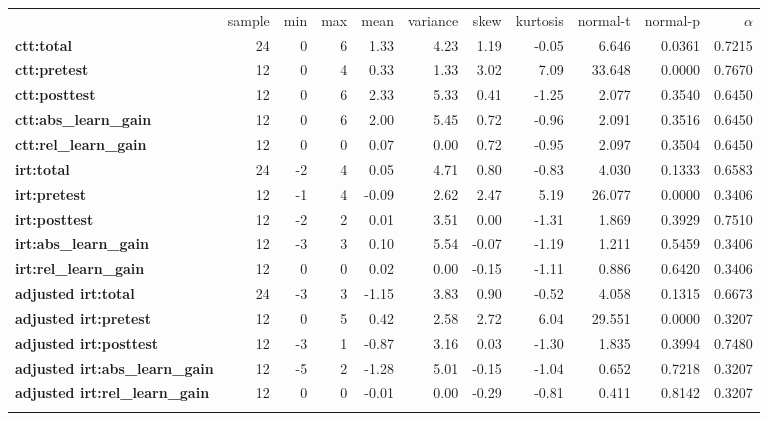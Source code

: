 \documentclass[]{article}
\begin{document}
\begin{longtable}[c]{@{}lrrrrrrrrrr@{}}
\toprule\addlinespace
& sample & min & max & mean & variance & skew & kurtosis & normal-t &
normal-p & $\alpha$
\\\addlinespace
\midrule\endhead
\textbf{ctt:total} & 24 & 0 & 6 & 1.33 & 4.23 & 1.19 & -0.05 & 6.646 &
0.0361 & 0.7215
\\\addlinespace
\textbf{ctt:pretest} & 12 & 0 & 4 & 0.33 & 1.33 & 3.02 & 7.09 & 33.648 &
0.0000 & 0.7670
\\\addlinespace
\textbf{ctt:posttest} & 12 & 0 & 6 & 2.33 & 5.33 & 0.41 & -1.25 & 2.077
& 0.3540 & 0.6450
\\\addlinespace
\textbf{ctt:abs\_learn\_gain} & 12 & 0 & 6 & 2.00 & 5.45 & 0.72 & -0.96
& 2.091 & 0.3516 & 0.6450
\\\addlinespace
\textbf{ctt:rel\_learn\_gain} & 12 & 0 & 0 & 0.07 & 0.00 & 0.72 & -0.95
& 2.097 & 0.3504 & 0.6450
\\\addlinespace
\textbf{irt:total} & 24 & -2 & 4 & 0.05 & 4.71 & 0.80 & -0.83 & 4.030 &
0.1333 & 0.6583
\\\addlinespace
\textbf{irt:pretest} & 12 & -1 & 4 & -0.09 & 2.62 & 2.47 & 5.19 & 26.077
& 0.0000 & 0.3406
\\\addlinespace
\textbf{irt:posttest} & 12 & -2 & 2 & 0.01 & 3.51 & 0.00 & -1.31 & 1.869
& 0.3929 & 0.7510
\\\addlinespace
\textbf{irt:abs\_learn\_gain} & 12 & -3 & 3 & 0.10 & 5.54 & -0.07 &
-1.19 & 1.211 & 0.5459 & 0.3406
\\\addlinespace
\textbf{irt:rel\_learn\_gain} & 12 & 0 & 0 & 0.02 & 0.00 & -0.15 & -1.11
& 0.886 & 0.6420 & 0.3406
\\\addlinespace
\textbf{adjusted irt:total} & 24 & -3 & 3 & -1.15 & 3.83 & 0.90 & -0.52
& 4.058 & 0.1315 & 0.6673
\\\addlinespace
\textbf{adjusted irt:pretest} & 12 & 0 & 5 & 0.42 & 2.58 & 2.72 & 6.04 &
29.551 & 0.0000 & 0.3207
\\\addlinespace
\textbf{adjusted irt:posttest} & 12 & -3 & 1 & -0.87 & 3.16 & 0.03 &
-1.30 & 1.835 & 0.3994 & 0.7480
\\\addlinespace
\textbf{adjusted irt:abs\_learn\_gain} & 12 & -5 & 2 & -1.28 & 5.01 &
-0.15 & -1.04 & 0.652 & 0.7218 & 0.3207
\\\addlinespace
\textbf{adjusted irt:rel\_learn\_gain} & 12 & 0 & 0 & -0.01 & 0.00 &
-0.29 & -0.81 & 0.411 & 0.8142 & 0.3207
\\\addlinespace
\bottomrule
\end{longtable}
\end{document}

